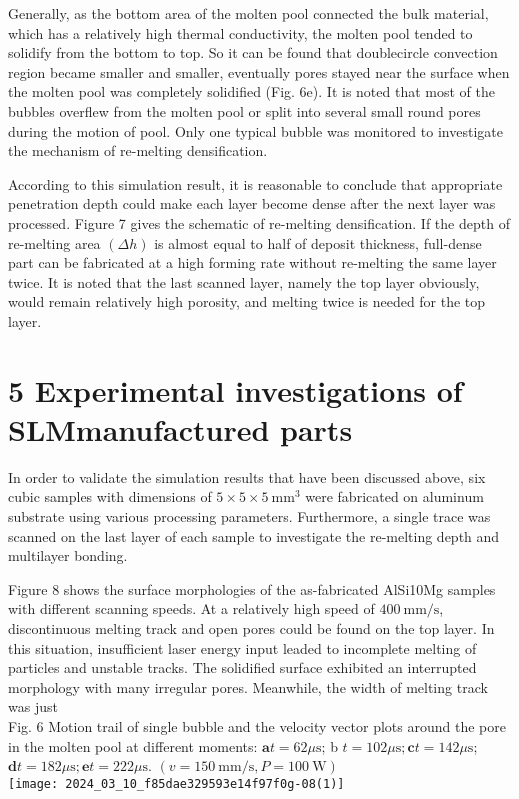 \documentclass[10pt]{article}
\begin{document}
Generally, as the bottom area of the molten pool connected the bulk material, which has a relatively high thermal conductivity, the molten pool tended to solidify from the bottom to top. So it can be found that doublecircle convection region became smaller and smaller, eventually pores stayed near the surface when the molten pool was completely solidified (Fig. 6e). It is noted that most of the bubbles overflew from the molten pool or split into several small round pores during the motion of pool. Only one typical bubble was monitored to investigate the mechanism of re-melting densification.

According to this simulation result, it is reasonable to conclude that appropriate penetration depth could make each layer become dense after the next layer was processed. Figure 7 gives the schematic of re-melting densification. If the depth of re-melting area $(\Delta h)$ is almost equal to half of deposit thickness, full-dense part can be fabricated at a high forming rate without re-melting the same layer twice. It is noted that the last scanned layer, namely the top layer obviously, would remain relatively high porosity, and melting twice is needed for the top layer.

\section*{5 Experimental investigations of SLMmanufactured parts}
In order to validate the simulation results that have been discussed above, six cubic samples with dimensions of $5 \times 5 \times 5 \mathrm{~mm}^{3}$ were fabricated on aluminum substrate using various processing parameters. Furthermore, a single trace was scanned on the last layer of each sample to investigate the re-melting depth and multilayer bonding.

Figure 8 shows the surface morphologies of the as-fabricated AlSi10Mg samples with different scanning speeds. At a relatively high speed of $400 \mathrm{~mm} / \mathrm{s}$, discontinuous melting track and open pores could be found on the top layer. In this situation, insufficient laser energy input leaded to incomplete melting of particles and unstable tracks. The solidified surface exhibited an interrupted morphology with many irregular pores. Meanwhile, the width of melting track was just\\
Fig. 6 Motion trail of single bubble and the velocity vector plots around the pore in the molten pool at different moments: $\mathbf{a} t=62 \mu \mathrm{s}$; b $t=102 \mu \mathrm{s} ; \mathbf{c} t=142 \mu \mathrm{s}$; $\mathbf{d} t=182 \mu \mathrm{s} ; \mathbf{e} t=222 \mu \mathrm{s}$. $(v=150 \mathrm{~mm} / \mathrm{s}, P=100 \mathrm{~W})$\\
\texttt{[image: 2024\_03\_10\_f85dae329593e14f97f0g-08(1)]}
\end{document}
